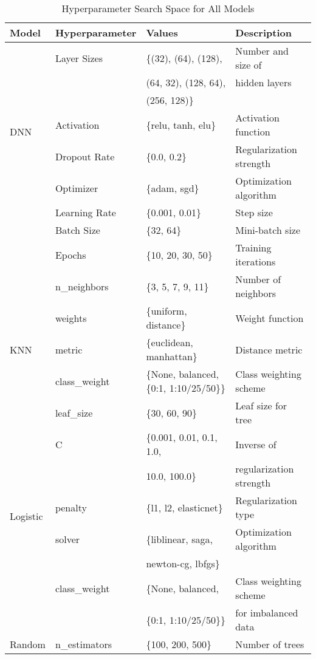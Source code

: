 \documentclass{article}
\begin{document}
\begin{table}[htbp]
    \centering
    \caption{Hyperparameter Search Space for All Models}
    \begin{tabular}{llll}
    \toprule
    \textbf{Model} & \textbf{Hyperparameter} & \textbf{Values} & \textbf{Description} \\
    \midrule
    \multirow{7}{*}{DNN} & Layer Sizes & \{(32), (64), (128), & Number and size of \\
    & & (64, 32), (128, 64), & hidden layers \\
    & & (256, 128)\} & \\
    & Activation & \{relu, tanh, elu\} & Activation function \\
    & Dropout Rate & \{0.0, 0.2\} & Regularization strength \\
    & Optimizer & \{adam, sgd\} & Optimization algorithm \\
    & Learning Rate & \{0.001, 0.01\} & Step size \\
    & Batch Size & \{32, 64\} & Mini-batch size \\
    & Epochs & \{10, 20, 30, 50\} & Training iterations \\
    \midrule
    \multirow{5}{*}{KNN} & n\_neighbors & \{3, 5, 7, 9, 11\} & Number of neighbors \\
    & weights & \{uniform, distance\} & Weight function \\
    & metric & \{euclidean, manhattan\} & Distance metric \\
    & class\_weight & \{None, balanced, \{0:1, 1:10/25/50\}\} & Class weighting scheme \\
    & leaf\_size & \{30, 60, 90\} & Leaf size for tree \\
    \midrule
    \multirow{6}{*}{Logistic} & C & \{0.001, 0.01, 0.1, 1.0, & Inverse of \\
    \multirow{6}{*}{Regression} & & 10.0, 100.0\} & regularization strength \\
    & penalty & \{l1, l2, elasticnet\} & Regularization type \\
    & solver & \{liblinear, saga, & Optimization algorithm \\
    & & newton-cg, lbfgs\} & \\
    & class\_weight & \{None, balanced, & Class weighting scheme \\
    & & \{0:1, 1:10/25/50\}\} & for imbalanced data \\
    \midrule
    \multirow{6}{*}{Random} & n\_estimators & \{100, 200, 500\} & Number of trees \\

\end{tabular}
\end{table}
\end{document}
